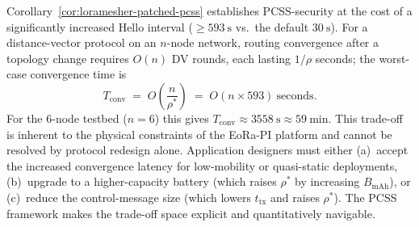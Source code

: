 \begin{remark}
\label{rem:convergence-tradeoff}
Corollary~\ref{cor:loramesher-patched-pcss} establishes PCSS-security
at the cost of a significantly increased Hello interval
($\ge 593\ \mathrm{s}$ vs.\ the default $30\ \mathrm{s}$).  For a
distance-vector protocol on an $n$-node network, routing convergence
after a topology change requires $O(n)$ DV rounds, each lasting
$1/\rho$ seconds; the worst-case convergence time is
\[
  T_{\mathrm{conv}} \;=\; O\!\left(\frac{n}{\rho^*}\right)
  \;=\; O(n \times 593)\ \mathrm{seconds}.
\]
For the 6-node testbed ($n=6$) this gives
$T_{\mathrm{conv}} \approx 3558\ \mathrm{s} \approx 59\ \mathrm{min}$.
This trade-off is inherent to the physical constraints of the EoRa-PI
platform and cannot be resolved by protocol redesign alone.  Application
designers must either (a)~accept the increased convergence latency for
low-mobility or quasi-static deployments, (b)~upgrade to a
higher-capacity battery (which raises $\rho^*$ by increasing
$B_{\mathrm{mAh}}$), or (c)~reduce the control-message size (which
lowers $t_{\mathrm{tx}}$ and raises $\rho^*$).  The PCSS framework
makes the trade-off space explicit and quantitatively navigable.
\end{remark}
